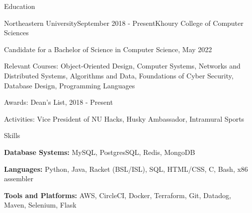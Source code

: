 \documentclass{resume}
\begin{document}
\begin{rSection}{Education}
\begin{rSubsection}{Northeastern University}{September 2018 - Present}{Khoury College of Computer Sciences}{}
\item Candidate for a Bachelor of Science in Computer Science, May 2022
\item Relevant Courses: Object-Oriented Design, Computer Systems, Networks and Distributed Systems,  Algorithms and Data, Foundations of Cyber Security, Database Design, Programming Languages
\item Awards: Dean's List, 2018 - Present
\item Activities: Vice President of NU Hacks, Husky Ambassador, Intramural Sports
\end{rSubsection}

\end{rSection}

\begin{rSection}{Skills}
  \begin{list}{\tiny\raisebox{1ex}{\textbullet}}{\leftmargin=2.0em}
    \item {\bf Database Systems:} MySQL, PostgresSQL, Redis, MongoDB
    \item {\bf Languages:} Python, Java, Racket (BSL/ISL), SQL, HTML/CSS, C, Bash, x86 assembler 
    \item {\bf Tools and Platforms:} AWS, CircleCI, Docker, Terraform, Git, Datadog, Maven, Selenium, Flask
  \end{list}
\end{rSection}
\end{document}
